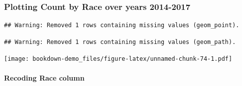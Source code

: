 \documentclass[
]{book}
\newenvironment{Shaded}{\begin{snugshade}}{\end{snugshade}}
\newcommand{\DataTypeTok}[1]{\textcolor[rgb]{0.13,0.29,0.53}{#1}}
\newcommand{\KeywordTok}[1]{\textcolor[rgb]{0.13,0.29,0.53}{\textbf{#1}}}
\newcommand{\NormalTok}[1]{#1}
\newcommand{\OperatorTok}[1]{\textcolor[rgb]{0.81,0.36,0.00}{\textbf{#1}}}
\newcommand{\StringTok}[1]{\textcolor[rgb]{0.31,0.60,0.02}{#1}}
\begin{document}
\hypertarget{plotting-count-by-race-over-years-2014-2017}{%
\subsubsection{Plotting Count by Race over years 2014-2017}\label{plotting-count-by-race-over-years-2014-2017}}

\begin{Shaded}
\end{Shaded}

\begin{verbatim}
## Warning: Removed 1 rows containing missing values (geom_point).
\end{verbatim}

\begin{verbatim}
## Warning: Removed 1 rows containing missing values (geom_path).
\end{verbatim}

\texttt{[image: bookdown-demo\_files/figure-latex/unnamed-chunk-74-1.pdf]}

\hypertarget{recoding-race-column}{%
\paragraph{Recoding Race column}\label{recoding-race-column}}
\end{document}
